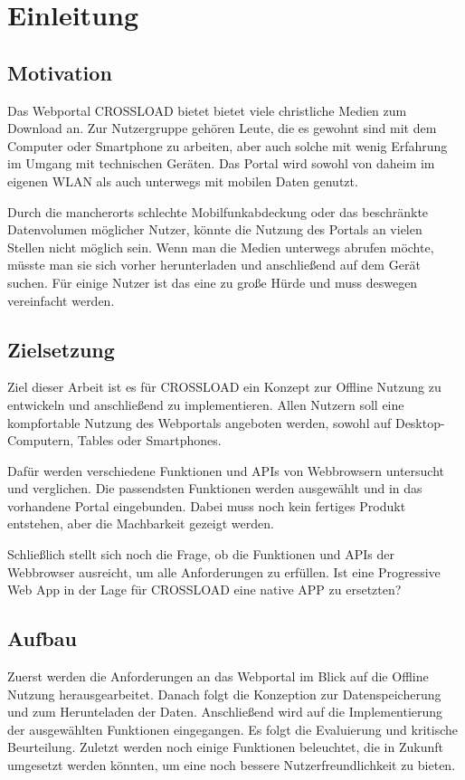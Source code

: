 \chapter{Einleitung}
\label{Kap1}

\section{Motivation}
Das Webportal CROSSLOAD bietet bietet viele christliche Medien zum Download an. Zur Nutzergruppe gehören Leute, die es gewohnt sind mit dem Computer oder Smartphone zu arbeiten, aber auch solche mit wenig Erfahrung im Umgang mit technischen Geräten. Das Portal wird sowohl von daheim im eigenen WLAN als auch unterwegs mit mobilen Daten genutzt.

Durch die mancherorts schlechte Mobilfunkabdeckung oder das beschränkte
Datenvolumen möglicher Nutzer, könnte die Nutzung des Portals an vielen Stellen nicht
möglich sein. Wenn man die Medien unterwegs abrufen möchte, müsste man sie sich
vorher herunterladen und anschließend auf dem Gerät suchen. Für einige Nutzer ist das
eine zu große Hürde und muss deswegen vereinfacht werden. 

\section{Zielsetzung}
Ziel dieser Arbeit ist es für CROSSLOAD ein Konzept zur Offline Nutzung zu entwickeln und anschließend zu implementieren. Allen Nutzern soll eine kompfortable Nutzung des Webportals angeboten werden, sowohl auf Desktop-Computern, Tables oder Smartphones. 

Dafür werden verschiedene Funktionen und APIs von Webbrowsern untersucht und verglichen. Die passendsten Funktionen werden ausgewählt und in das vorhandene Portal eingebunden. Dabei muss noch kein fertiges Produkt entstehen, aber die Machbarkeit gezeigt werden. 

Schließlich stellt sich noch die Frage, ob die Funktionen und APIs der Webbrowser ausreicht, um alle Anforderungen zu erfüllen. Ist eine Progressive Web App in der Lage für CROSSLOAD eine native APP zu ersetzten?

\section{Aufbau}
Zuerst werden die Anforderungen an das Webportal im Blick auf die Offline Nutzung herausgearbeitet. Danach folgt die Konzeption zur Datenspeicherung und zum Herunteladen der Daten. Anschließend wird auf die Implementierung der ausgewählten Funktionen eingegangen. Es folgt die Evaluierung und kritische Beurteilung. Zuletzt werden noch einige Funktionen beleuchtet, die in Zukunft umgesetzt werden könnten, um eine noch bessere Nutzerfreundlichkeit zu bieten.

